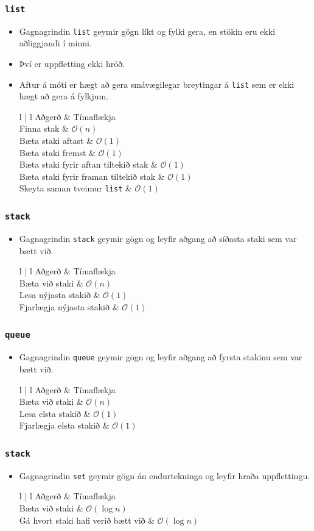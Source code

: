 \documentclass{beamer}
\newcommand\env[2]
{
	\begin{#1}
	#2
	\end{#1}
}
\begin{document}
\env{frame}
{
	\frametitle{\texttt{list}}
	\env{itemize}
	{
		\item<1-> Gagnagrindin \texttt{list} geymir gögn líkt og fylki gera, en stökin eru ekki aðliggjandi í minni.
		\item<2-> Því er uppfletting ekki hröð.
		\item<3-> Aftur á móti er hægt að gera smávægilegar breytingar á \texttt{list} sem er ekki hægt að gera á fylkjum.
		\env{tabular}
		{
			{l | l}
			Aðgerð & Tímaflækja\\
			\hline
			Finna stak & $\mathcal{O}(n)$\\
			Bæta staki aftast & $\mathcal{O}(1)$\\
			Bæta staki fremst & $\mathcal{O}(1)$\\
			Bæta staki fyrir aftan tiltekið stak & $\mathcal{O}(1)$\\
			Bæta staki fyrir framan tiltekið stak & $\mathcal{O}(1)$\\
			Skeyta saman tveimur \texttt{list} & $\mathcal{O}(1)$\\
		}
	}
}

\env{frame}
{
	\frametitle{\texttt{stack}}
	\env{itemize}
	{
		\item<1-> Gagnagrindin \texttt{stack} geymir gögn og leyfir aðgang að síðasta staki sem var bætt við.
		\env{tabular}
		{
			{l | l}
			Aðgerð & Tímaflækja\\
			\hline
			Bæta við staki & $\mathcal{O}(n)$\\
			Lesa nýjasta stakið & $\mathcal{O}(1)$\\
			Fjarlægja nýjasta stakið  & $\mathcal{O}(1)$\\
		}
	}
}

\env{frame}
{
	\frametitle{\texttt{queue}}
	\env{itemize}
	{
		\item<1-> Gagnagrindin \texttt{queue} geymir gögn og leyfir aðgang að fyrsta stakinu sem var bætt við.
		\env{tabular}
		{
			{l | l}
			Aðgerð & Tímaflækja\\
			\hline
			Bæta við staki & $\mathcal{O}(n)$\\
			Lesa elsta stakið & $\mathcal{O}(1)$\\
			Fjarlægja elsta stakið  & $\mathcal{O}(1)$\\
		}
	}
}

\env{frame}
{
	\frametitle{\texttt{stack}}
	\env{itemize}
	{
		\item<1-> Gagnagrindin \texttt{set} geymir gögn án endurtekninga og leyfir hraða uppflettingu.
		\env{tabular}
		{
			{l | l}
			Aðgerð & Tímaflækja\\
			\hline
			Bæta við staki & $\mathcal{O}(\log n)$\\
			Gá hvort staki hafi verið bætt við  & $\mathcal{O}(\log n)$\\
		}
	}
}
\end{document}
